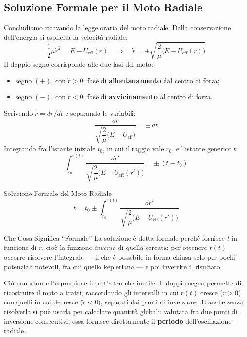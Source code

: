 \subsection{Soluzione Formale per il Moto Radiale}

Concludiamo ricavando la legge oraria del moto radiale. Dalla conservazione dell'energia si esplicita la velocità radiale:
\begin{equation}
    \frac{1}{2}\mu \dot{r}^2 = E - U_{\text{eff}}(r)
    \quad \Longrightarrow \quad
    \dot{r} = \pm \sqrt{\frac{2}{\mu}\big(E - U_{\text{eff}}(r)\big)}
\end{equation}
Il doppio segno corrisponde alle due fasi del moto:
\begin{itemize}
    \item segno $(+)$, con $\dot{r} > 0$: fase di \textbf{allontanamento} dal centro di forza;
    \item segno $(-)$, con $\dot{r} < 0$: fase di \textbf{avvicinamento} al centro di forza.
\end{itemize}

Scrivendo $\dot{r} = dr/dt$ e separando le variabili:
\begin{equation}
    \frac{dr}{\sqrt{\dfrac{2}{\mu}\big(E - U_{\text{eff}}\big)}} = \pm \, dt
\end{equation}
Integrando fra l'istante iniziale $t_0$, in cui il raggio vale $r_0$, e l'istante generico $t$:
\begin{equation}
    \int_{r_0}^{r(t)} \frac{dr'}{\sqrt{\dfrac{2}{\mu}\big(E - U_{\text{eff}}(r')\big)}} = \pm \,(t - t_0)
\end{equation}

\begin{formulario}{Soluzione Formale del Moto Radiale}
\begin{equation}
    t = t_0 \pm \int_{r_0}^{r(t)} \frac{dr'}{\sqrt{\dfrac{2}{\mu}\big(E - U_{\text{eff}}(r')\big)}}
\end{equation}
\end{formulario}

\begin{osservazione}{Che Cosa Significa ``Formale''}
La soluzione è detta formale perché fornisce $t$ in funzione di $r$, cioè la funzione \emph{inversa} di quella cercata: per ottenere $r(t)$ occorre risolvere l'integrale --- il che è possibile in forma chiusa solo per pochi potenziali notevoli, fra cui quello kepleriano --- e poi invertire il risultato.

Ciò nonostante l'espressione è tutt'altro che inutile. Il doppio segno permette di ricostruire il moto a tratti, raccordando gli intervalli in cui $r(t)$ cresce ($\dot{r} > 0$) con quelli in cui decresce ($\dot{r} < 0$), separati dai punti di inversione. E anche senza risolverla si può usarla per calcolare quantità globali: valutata fra due punti di inversione consecutivi, essa fornisce direttamente il \textbf{periodo} dell'oscillazione radiale.
\end{osservazione}
